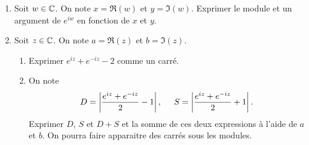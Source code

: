 \begin{enumerate}
  \item Soit $w \in \mathbb{C}$. On note $x= \Re(w)$ et $y=\Im(w)$. Exprimer le module et un argument de $e^{iw}$ en fonction de $x$ et $y$.
  \item Soit $z \in \mathbb{C}$. On note $a=\Re(z)$ et $b=\Im(z)$.
  \begin{enumerate}
    \item Exprimer $e^{iz} + e^{-iz} - 2$ comme un carré.
    \item On note
\[
 D = \left \vert \frac{e^{iz}+e^{-iz}}{2}-1\right \vert, \hspace{0.5cm}
 S = \left \vert \frac{e^{iz}+e^{-iz}}{2}+1\right \vert.
\]
Exprimer $D$, $S$ et $D + S$ et la somme de ces deux expressions à l'aide de $a$ et $b$. On pourra faire apparaitre des carrés sous les modules.

  \end{enumerate}
\end{enumerate}

